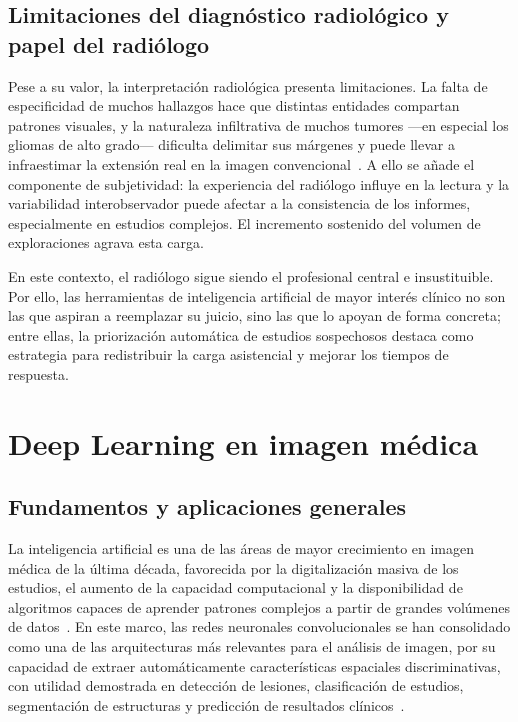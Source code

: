 \subsection{Limitaciones del diagnóstico radiológico y papel del radiólogo}

Pese a su valor, la interpretación radiológica presenta limitaciones. La falta de
especificidad de muchos hallazgos hace que distintas entidades compartan patrones
visuales, y la naturaleza infiltrativa de muchos tumores ---en especial los
gliomas de alto grado--- dificulta delimitar sus márgenes y puede llevar a
infraestimar la extensión real en la imagen convencional~\cite{wen2008gliomas}. A
ello se añade el componente de subjetividad: la experiencia del radiólogo influye
en la lectura y la variabilidad interobservador puede afectar a la consistencia
de los informes, especialmente en estudios complejos. El incremento sostenido del
volumen de exploraciones agrava esta carga.

En este contexto, el radiólogo sigue siendo el profesional central e
insustituible. Por ello, las herramientas de inteligencia artificial de mayor
interés clínico no son las que aspiran a reemplazar su juicio, sino las que lo
apoyan de forma concreta; entre ellas, la priorización automática de estudios
sospechosos destaca como estrategia para redistribuir la carga asistencial y
mejorar los tiempos de respuesta.

\section{Deep Learning en imagen médica}

\subsection{Fundamentos y aplicaciones generales}

La inteligencia artificial es una de las áreas de mayor crecimiento en imagen
médica de la última década, favorecida por la digitalización masiva de los
estudios, el aumento de la capacidad computacional y la disponibilidad de
algoritmos capaces de aprender patrones complejos a partir de grandes volúmenes
de datos~\cite{litjens2017survey,avanzo2024evolution}. En este marco, las redes
neuronales convolucionales se han consolidado como una de las arquitecturas más
relevantes para el análisis de imagen, por su capacidad de extraer
automáticamente características espaciales discriminativas, con utilidad
demostrada en detección de lesiones, clasificación de estudios, segmentación de
estructuras y predicción de resultados clínicos~\cite{litjens2017survey,langs2023ai}.

